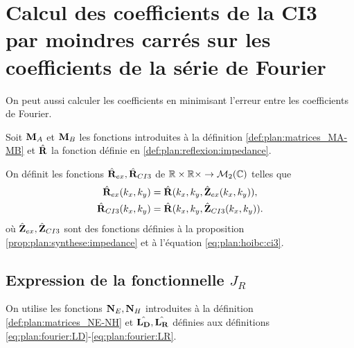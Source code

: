 \section{Calcul des coefficients de la CI3 par moindres carrés sur les coefficients de la série de Fourier}

  On peut aussi calculer les coefficients en minimisant l'erreur entre les coefficients de Fourier.

  Soit \(\mathbf{M}_A\) et \(\mathbf{M}_B\) les fonctions introduites à la définition \ref{def:plan:matrices_MA-MB} et \(\hat{\mathbf{R}}\) la fonction définie en \ref{def:plan:reflexion:impedance}.

  \begin{defn}%
    \label{def:plan:minimisation:matrices_MR}
    On définit les fonctions \(\hat{\mathbf{R}}_{ex}, \hat{\mathbf{R}}_{CI3}\) de \(\mathbb R\times\mathbb R\times \rightarrow \mathcal{M}_2(\mathbb C)\) telles que
    \begin{align*}
      \hat{\mathbf{R}}_{ex}(k_x,k_y) &= \hat{\mathbf{R}}(k_x,k_y, \hat{\mathbf{Z}}_{ex}(k_x,k_y)),
      \\
      \hat{\mathbf{R}}_{CI3}(k_x,k_y) &= \hat{\mathbf{R}}(k_x,k_y, \hat{\mathbf{Z}}_{CI3}(k_x,k_y)).
    \end{align*}
    où \(\hat{\mathbf{Z}}_{ex},\hat{\mathbf{Z}}_{CI3}\) sont des fonctions définies à la proposition \ref{prop:plan:synthese:impedance} et à l'équation \eqref{eq:plan:hoibc:ci3}.
  \end{defn}

  \subsection[Expression de la fonctionnelle JR]{Expression de la fonctionnelle \(J_R\)}

    On utilise les fonctions \(\mathbf{N}_E, \mathbf{N}_H\) introduites à la définition \ref{def:plan:matrices_NE-NH} et \(\hat{\mathbf{L_D}},\hat{\mathbf{L_R}}\) définies aux définitions \ref{eq:plan:fourier:LD}-\ref{eq:plan:fourier:LR}.

